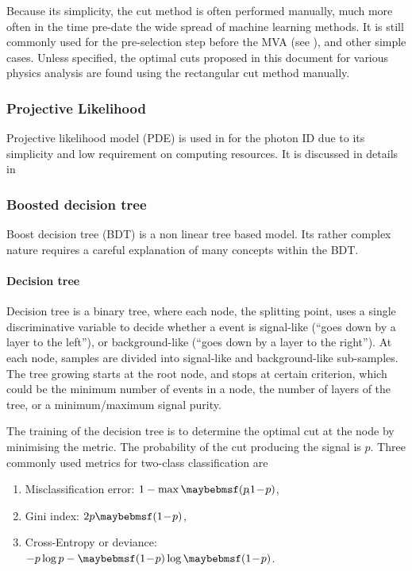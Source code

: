 Because its simplicity, the cut method is often performed manually, much more often in the time pre-date the wide spread of machine learning methods. It is still commonly used for the pre-selection step before the MVA (see ), and other simple cases. Unless specified, the optimal cuts proposed in this document for various physics analysis are found using the rectangular cut method manually.

\subsubsection{Projective Likelihood}

Projective likelihood model (PDE) is used in \pandora for the photon ID  due to its simplicity and low requirement on computing resources. It is discussed in details in 


\subsubsection{Boosted decision tree}
\label{sec:analysisBDT}

Boost decision tree (BDT) is a non linear tree based model. Its rather complex nature requires a careful explanation of many concepts within the BDT.

\paragraph{Decision tree}
Decision tree is a binary tree, where each node, the splitting point, uses a single discriminative variable to decide whether a event is signal-like (``goes down by a layer to the left''), or background-like (``goes down by a layer to the right''). At each node, samples are divided into signal-like and background-like sub-samples. The tree growing starts at the root node, and stops at certain criterion, which could be the minimum number of events in a node, the number of layers of the tree, or a minimum/maximum signal purity.

The training of the decision tree is to determine the optimal cut at the node by minimising the metric. The probability of the cut producing the signal is $p$. Three commonly used metrics for two-class classification are
\begin{enumerate}
\item Misclassification error:  $1 - \max\parenths{p\!,\!1\!-\!p}$,
\item Gini index: $2p\parenths{1\!-\!p}$,
\item Cross-Entropy or deviance: $-p\log{p}-\parenths{1\!-\!p}\log\parenths{1\!-\!p}$.
\end{enumerate}

